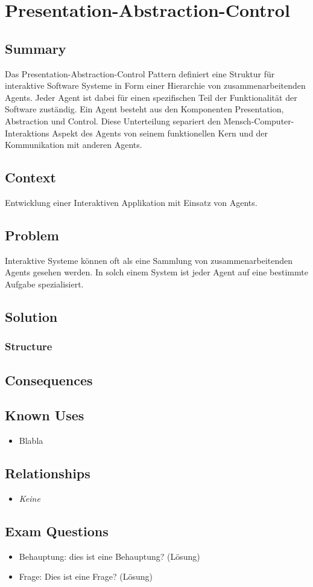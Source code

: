\chapter{Presentation-Abstraction-Control}

\section{Summary}
Das Presentation-Abstraction-Control Pattern definiert eine Struktur für interaktive Software Systeme in Form einer Hierarchie von zusammenarbeitenden Agents. Jeder Agent ist dabei für einen spezifischen Teil der Funktionalität der Software zuständig. Ein Agent besteht aus den Komponenten Presentation, Abstraction und Control. Diese Unterteilung separiert den Mensch-Computer-Interaktions Aspekt des Agents von seinem funktionellen Kern und der Kommunikation mit anderen Agents.
\section{Context}
Entwicklung einer Interaktiven Applikation mit Einsatz von Agents.
\section{Problem}
Interaktive Systeme können oft als eine Sammlung von zusammenarbeitenden Agents gesehen werden. In solch einem System ist jeder Agent auf eine bestimmte Aufgabe spezialisiert. 

\section{Solution}


\subsection{Structure}

\section{Consequences}
\begin{itemize}
\end{itemize}

\section{Known Uses}
\begin{itemize}
	\item Blabla
\end{itemize}

\section{Relationships}
\begin{itemize}
	\item \textit{Keine} 
\end{itemize}

\section{Exam Questions}
\begin{itemize}
  \item Behauptung: dies ist eine Behauptung? (Lösung)
    \item Frage: Dies ist eine Frage? (Lösung)
\end{itemize}
